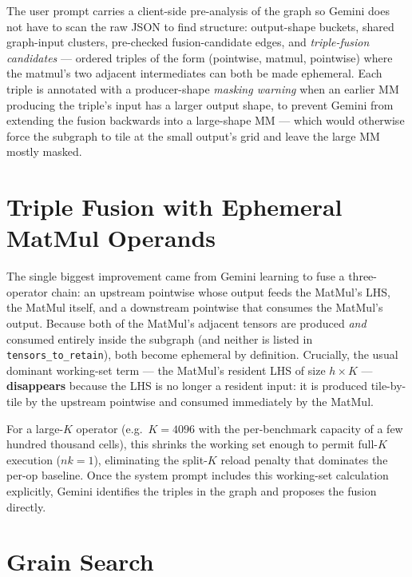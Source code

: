 The user prompt carries a client-side pre-analysis of the graph so
Gemini does not have to scan the raw JSON to find structure:
output-shape buckets, shared graph-input clusters, pre-checked
fusion-candidate edges, and \emph{triple-fusion candidates} --- ordered
triples of the form (pointwise, matmul, pointwise) where the matmul's
two adjacent intermediates can both be made ephemeral. Each triple is
annotated with a producer-shape \emph{masking warning} when an earlier
MM producing the triple's input has a larger output shape, to prevent
Gemini from extending the fusion backwards into a large-shape MM
--- which would otherwise force the subgraph to tile at the small
output's grid and leave the large MM mostly masked.


\section{Triple Fusion with Ephemeral MatMul Operands}

The single biggest improvement came from Gemini learning to fuse a
three-operator chain: an upstream pointwise whose output feeds the
MatMul's LHS, the MatMul itself, and a downstream pointwise that
consumes the MatMul's output. Because both of the MatMul's adjacent
tensors are produced \emph{and} consumed entirely inside the subgraph
(and neither is listed in \texttt{tensors\_to\_retain}), both become
ephemeral by definition. Crucially, the usual dominant working-set
term --- the MatMul's resident LHS of size $h \times K$ --- \textbf{%
disappears} because the LHS is no longer a resident input: it is
produced tile-by-tile by the upstream pointwise and consumed
immediately by the MatMul.

For a large-$K$ operator (e.g.\ $K = 4096$ with the per-benchmark
capacity of a few hundred thousand cells), this shrinks the working
set enough to permit full-$K$ execution ($nk = 1$), eliminating the
split-$K$ reload penalty that dominates the per-op baseline. Once the
system prompt includes this working-set calculation explicitly,
Gemini identifies the triples in the graph and proposes the fusion
directly.


\section{Grain Search}

